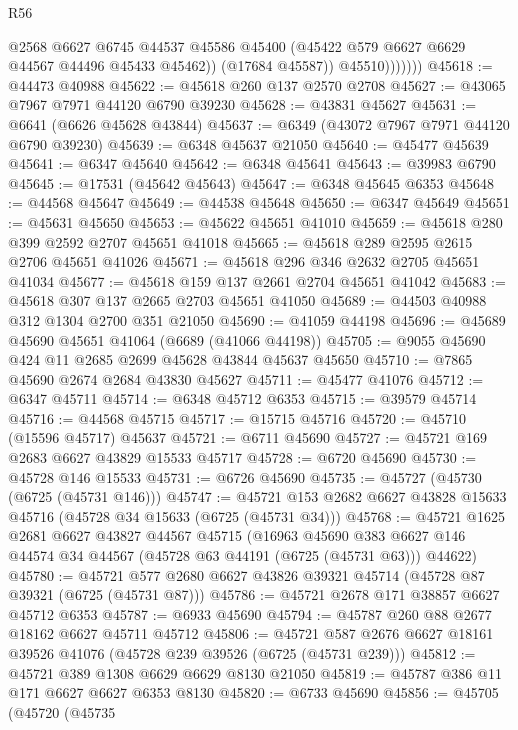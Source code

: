 \begin{lexlean}{R56}
\begin{coremodule}
                      @2568
                      @6627
                      @6745
                      @44537
                      @45586
                      @45400
                      (@45422 @579 @6627 @6629 @44567 @44496 @45433 @45462))
                    (@17684 @45587))
                  @45510)))))))
@45618 := @44473 @40988
@45622 := @45618 @260 @137 @2570 @2708
@45627 := @43065 @7967 @7971 @44120 @6790 @39230
@45628 := @43831 @45627
@45631 := @6641 (@6626 @45628 @43844)
@45637 := @6349 (@43072 @7967 @7971 @44120 @6790 @39230)
@45639 := @6348 @45637 @21050
@45640 := @45477 @45639
@45641 := @6347 @45640
@45642 := @6348 @45641
@45643 := @39983 @6790
@45645 := @17531 (@45642 @45643)
@45647 := @6348 @45645 @6353
@45648 := @44568 @45647
@45649 := @44538 @45648
@45650 := @6347 @45649
@45651 := @45631 @45650
@45653 := @45622 @45651 @41010
@45659 := @45618 @280 @399 @2592 @2707 @45651 @41018
@45665 := @45618 @289 @2595 @2615 @2706 @45651 @41026
@45671 := @45618 @296 @346 @2632 @2705 @45651 @41034
@45677 := @45618 @159 @137 @2661 @2704 @45651 @41042
@45683 := @45618 @307 @137 @2665 @2703 @45651 @41050
@45689 := @44503 @40988 @312 @1304 @2700 @351 @21050
@45690 := @41059 @44198
@45696 := @45689 @45690 @45651 @41064 (@6689 (@41066 @44198))
@45705 := @9055 @45690 @424 @11 @2685 @2699 @45628 @43844 @45637 @45650
@45710 := @7865 @45690 @2674 @2684 @43830 @45627
@45711 := @45477 @41076
@45712 := @6347 @45711
@45714 := @6348 @45712 @6353
@45715 := @39579 @45714
@45716 := @44568 @45715
@45717 := @15715 @45716
@45720 := @45710 (@15596 @45717) @45637
@45721 := @6711 @45690
@45727 := @45721 @169 @2683 @6627 @43829 @15533 @45717
@45728 := @6720 @45690
@45730 := @45728 @146 @15533
@45731 := @6726 @45690
@45735 := @45727 (@45730 (@6725 (@45731 @146)))
@45747 := @45721 @153 @2682 @6627 @43828 @15633 @45716 (@45728 @34 @15633 (@6725 (@45731 @34)))
@45768 := @45721
    @1625
    @2681
    @6627
    @43827
    @44567
    @45715
    (@16963
      @45690
      @383
      @6627
      @146
      @44574
      @34
      @44567
      (@45728 @63 @44191 (@6725 (@45731 @63)))
      @44622)
@45780 := @45721 @577 @2680 @6627 @43826 @39321 @45714 (@45728 @87 @39321 (@6725 (@45731 @87)))
@45786 := @45721 @2678 @171 @38857 @6627 @45712 @6353
@45787 := @6933 @45690
@45794 := @45787 @260 @88 @2677 @18162 @6627 @45711 @45712
@45806 := @45721 @587 @2676 @6627 @18161 @39526 @41076 (@45728 @239 @39526 (@6725 (@45731 @239)))
@45812 := @45721 @389 @1308 @6629 @6629 @8130 @21050
@45819 := @45787 @386 @11 @171 @6627 @6627 @6353 @8130
@45820 := @6733 @45690
@45856 := @45705
    (@45720
      (@45735

\end{coremodule}
\end{lexlean}

